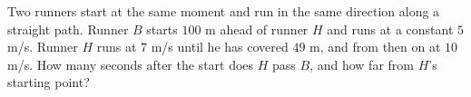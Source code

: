 Two runners start at the same moment and run in the same direction along a straight path. Runner $B$ starts $100$ m ahead of runner $H$ and runs at a constant $5$ m/s. Runner $H$ runs at $7$ m/s until he has covered $49$ m, and from then on at $10$ m/s. How many seconds after the start does $H$ pass $B$, and how far from $H$'s starting point?

